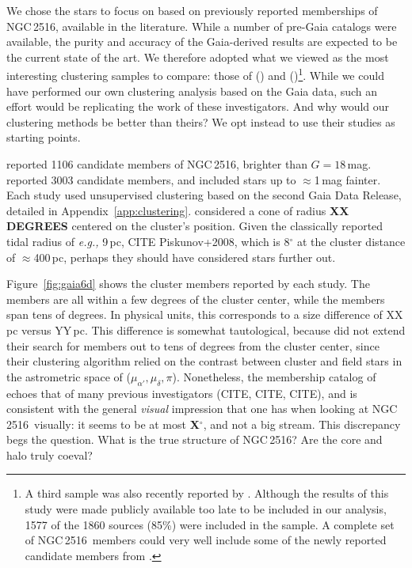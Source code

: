 \documentclass[12pt,twocolumn,tighten]{aastex63}
\newcommand{\cn}{NGC\,2516} %
\begin{document}
We chose the stars to focus on based on previously reported
memberships of NGC\,2516, available in the literature.  While a number
of pre-Gaia catalogs were available, the purity and accuracy of the
Gaia-derived results are expected to be the current state of the art.
We therefore adopted what we viewed as the most interesting clustering
samples to compare: those of \citet{cantatgaudin_gaia_2018}
() and
\citet{kounkel_untangling_2019}
()\footnote{A third sample was
also recently reported by \citet{meingast_2021}. Although the results
of this study were made publicly available too late to be included in
our analysis,  1577 of the 1860 \citet{meingast_2021} sources (85\%)
were included in the \citet{kounkel_untangling_2019} sample.  A
complete set of \cn\ members could very well include some of the newly
reported candidate members from \citet{meingast_2021}.}. While we
could have performed our own clustering analysis based on the Gaia
data, such an effort would be replicating the work of these
investigators. And why would our clustering methods be better than
theirs? We opt instead to use their studies as starting points.

 reported 1106 candidate members of
\cn, brighter than $G=18$\,mag.  \citet{kounkel_untangling_2019}
reported 3003 candidate members, and included stars up to
$\approx$1\,mag fainter.  Each study used unsupervised clustering
based on the second Gaia Data Release, detailed in
Appendix~\ref{app:clustering}.
 considered a cone of radius {\bf
XX DEGREES} centered on the cluster's position.
Given the classically reported tidal radius of {\it e.g.,} 9\,pc, CITE
Piskunov+2008, which is 8$^\circ$ at the cluster distance of
$\approx$400\,pc, perhaps they should have considered stars further
out.


Figure~\ref{fig:gaia6d} shows the cluster members reported by each
study.  The  members are all within
a few degrees of the cluster center, while the
 members span tens of degrees.  In
physical units, this corresponds to a size difference of XX\,pc versus
YY\,pc.  This difference is somewhat tautological, because
 did not extend their search for
members out to tens of degrees from the cluster center, since their
clustering algorithm relied on the contrast between cluster and field
stars in the astrometric space of ($\mu_{\alpha'}, \mu_\delta, \pi$).
Nonetheless, the membership catalog of 
echoes that of many previous investigators (CITE, CITE, CITE), and is
consistent with the general {\it visual} impression that one has when
looking at \cn\ visually: it seems to be at most {\bf X$^\circ$}, and
not a big stream.
This discrepancy begs the question.  What is the true structure of
\cn?  Are the core and halo truly coeval?
\end{document}
